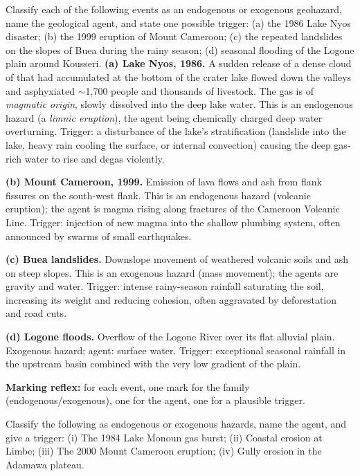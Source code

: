 \documentclass[11pt]{article}
\newcommand{\cle}[1]{{\popxbold\color{popdark}#1}}
\begin{document}
\begin{exoresolu}
Classify each of the following events as an endogenous or exogenous geohazard, name the geological agent, and state one possible trigger: (a) the 1986 Lake Nyos disaster; (b) the 1999 eruption of Mount Cameroon; (c) the repeated landslides on the slopes of Buea during the rainy season; (d) seasonal flooding of the Logone plain around Kousseri.
\tcblower
\textbf{(a) Lake Nyos, 1986.} A sudden release of a dense cloud of  that had accumulated at the bottom of the crater lake flowed down the valleys and asphyxiated $\sim$1,700 people and thousands of livestock. The gas is of \emph{magmatic origin}, slowly dissolved into the deep lake water. This is an \cle{endogenous hazard} (a \emph{limnic eruption}), the agent being chemically charged deep water overturning. Trigger: a disturbance of the lake's stratification (landslide into the lake, heavy rain cooling the surface, or internal convection) causing the deep gas-rich water to rise and degas violently.

\textbf{(b) Mount Cameroon, 1999.} Emission of lava flows and ash from flank fissures on the south-west flank. This is an \cle{endogenous hazard} (volcanic eruption); the agent is magma rising along fractures of the Cameroon Volcanic Line. Trigger: injection of new magma into the shallow plumbing system, often announced by swarms of small earthquakes.

\textbf{(c) Buea landslides.} Downslope movement of weathered volcanic soils and ash on steep slopes. This is an \cle{exogenous hazard} (mass movement); the agents are gravity and water. Trigger: intense rainy-season rainfall saturating the soil, increasing its weight and reducing cohesion, often aggravated by deforestation and road cuts.

\textbf{(d) Logone floods.} Overflow of the Logone River over its flat alluvial plain. \cle{Exogenous hazard}; agent: surface water. Trigger: exceptional seasonal rainfall in the upstream basin combined with the very low gradient of the plain.

\textbf{Marking reflex:} for each event, one mark for the family (endogenous/exogenous), one for the agent, one for a plausible trigger.
\end{exoresolu}

\begin{exercice}
Classify the following as endogenous or exogenous hazards, name the agent, and give a trigger: (i) The 1984 Lake Monoun gas burst; (ii) Coastal erosion at Limbe; (iii) The 2000 Mount Cameroon eruption; (iv) Gully erosion in the Adamawa plateau.
\end{exercice}
\end{document}
